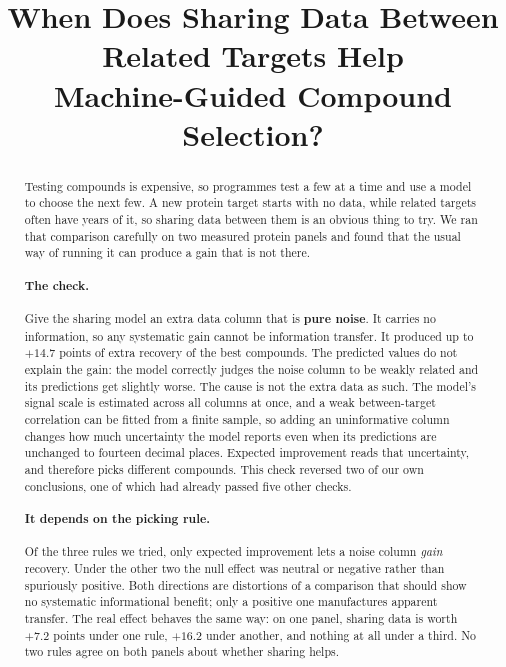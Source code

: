 \documentclass[11pt]{article}
\title{When Does Sharing Data Between Related Targets Help\\
       Machine-Guided Compound Selection?}
\author{}
\date{}
\begin{document}
\maketitle

\begin{abstract}
\noindent
Testing compounds is expensive, so programmes test a few at a time and use a
model to choose the next few. A new protein target starts with no data, while
related targets often have years of it, so sharing data between them is an
obvious thing to try. We ran that comparison carefully on two measured protein
panels and found that the usual way of running it can produce a gain that is not
there.

\paragraph{The check.} Give the sharing model an extra data column that is
\textbf{pure noise}. It carries no information, so any systematic gain cannot be information
transfer. It produced
up to $\mathbf{+14.7}$ points of extra recovery of the best compounds. The predicted values do not explain the gain: the model correctly judges the
noise column to be weakly related and its predictions get slightly worse. The cause is not the extra data as such. The model's signal scale is estimated
across all columns at once, and a weak between-target correlation can be fitted
from a finite sample, so adding an uninformative column changes how much
uncertainty the model reports even when its predictions are unchanged to
fourteen decimal places. Expected improvement reads that uncertainty, and
therefore picks different compounds. This check reversed two of our own
conclusions, one of which had already passed five other checks.

\paragraph{It depends on the picking rule.} Of the three rules we tried, only
expected improvement lets a noise column \emph{gain} recovery. Under the other two the null effect was neutral or negative rather than
spuriously positive. Both directions are distortions of a comparison that should
show no systematic informational benefit; only a positive one manufactures
apparent transfer. The
real effect behaves the same way: on one panel, sharing data is worth $+7.2$
points under one rule, $+16.2$ under another, and nothing at all under a third.
No two rules agree on both panels about whether sharing helps.


\end{abstract}
\end{document}

